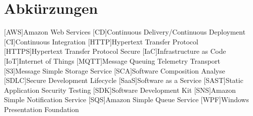 \chapter*{Abkürzungen}

\begin{acronym}
    [AWS]{Amazon Web Services}
    [CD]{Continuous Delivery/Continuous Deployment}
    [CI]{Continuous Integration}
    [HTTP]{Hypertext Transfer Protocol}
    [HTTPS]{Hypertext Transfer Protocol Secure}    
    [IaC]{Infrastructure as Code}
    [IoT]{Internet of Things}
    [MQTT]{Message Queuing Telemetry Transport}
    [S3]{Message Simple Storage Service}
    [SCA]{Software Composition Analyse}
    [SDLC]{Secure Development Lifecycle}
    [SaaS]{Software as a Service}
    [SAST]{Static Application Security Testing}  
    [SDK]{Software Development Kit}
    [SNS]{Amazon Simple Notification Service}
    [SQS]{Amazon Simple Queue Service}
    [WPF]{Windows Presentation Foundation}    
\end{acronym}
